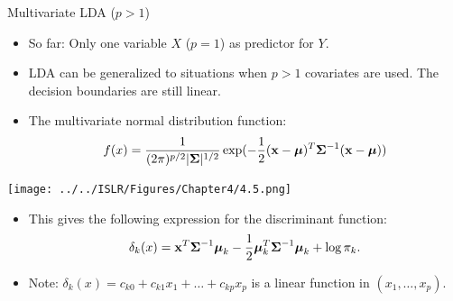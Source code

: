 \documentclass[10pt,ignorenonframetext,]{beamer}
\begin{document}
\begin{frame}

\begin{block}{Multivariate LDA (\(p>1\))}

\vspace{2mm}

\begin{itemize}
\item
  So far: Only one variable \(X\) (\(p=1\)) as predictor for \(Y\).
\item
  LDA can be generalized to situations when \(p>1\) covariates are used.
  The decision boundaries are still linear.
\item
  The multivariate normal distribution function:
  \[f(x) = \frac{1}{(2 \pi)^{p/2}|\boldsymbol{\Sigma}|^{1/2}}\exp({-\frac{1}{2}({\bf x}-\boldsymbol\mu)^T \boldsymbol{\Sigma}^{-1}({\bf x}-\boldsymbol\mu)})\]
\end{itemize}

\centering
\texttt{[image: ../../ISLR/Figures/Chapter4/4.5.png]}

\end{block}

\end{frame}

\begin{frame}

\begin{itemize}
\item
  This gives the following expression for the discriminant function:
  \[\delta_k(x) = {\bf x}^T \boldsymbol{\Sigma}^{-1}\boldsymbol\mu_k - \frac{1}{2}\boldsymbol\mu_k^T \boldsymbol{\Sigma}^{-1}\boldsymbol\mu_k + \log \pi_k.\]
\item
  Note: \(\delta_k(x) = c_{k0} + c_{k1}x_1 + \ldots + c_{kp}x_p\) is a
  linear function in \((x_1,\ldots ,x_p)\).
\end{itemize}

\end{frame}
\end{document}
